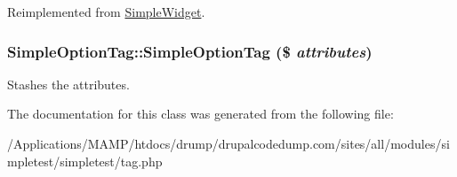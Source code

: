 Reimplemented from \hyperlink{class_simple_widget_a9e048a450e2d29a601e672deda9fa869}{SimpleWidget}.\hypertarget{class_simple_option_tag_aca0401931c341219b640106907c9d1a9}{
\subsubsection[{SimpleOptionTag}]{\setlength{\rightskip}{0pt plus 5cm}SimpleOptionTag::SimpleOptionTag (\$ {\em attributes})}}
\label{class_simple_option_tag_aca0401931c341219b640106907c9d1a9}
Stashes the attributes. 

The documentation for this class was generated from the following file:\begin{DoxyCompactItemize}
\item 
/Applications/MAMP/htdocs/drump/drupalcodedump.com/sites/all/modules/simpletest/simpletest/tag.php\end{DoxyCompactItemize}
